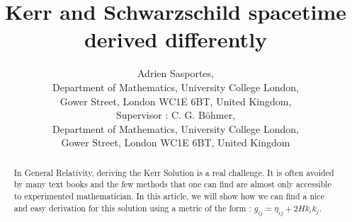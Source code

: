 \documentclass[a4paper,12pt]{article}
\title{Kerr and Schwarzschild spacetime derived differently}
\author{Adrien Sasportes,\\
Department of Mathematics, University College London, \\
Gower Street, London WC1E 6BT, United Kingdom,
\\ Supervisor : C. G. B\"ohmer,\\
Department of Mathematics, University College London, \\
Gower Street, London WC1E 6BT, United Kingdom
}
\theoremstyle{definition}
\begin{document}
\pagestyle{headings}
\begin{titlepage}
\clearpage\maketitle
\begin{abstract}
	In General Relativity, deriving the Kerr Solution is a real challenge.
	It is often avoided by many text books and the few methods that one can find are almost only accessible to experimented mathematician.
	In this article, we will show how we can find a nice and easy derivation for this solution using a metric of the form : $g_{ij}=\eta_{ij}+2Hk_ik_j$.
\end{abstract}
\thispagestyle{empty}
\pagebreak
\clearpage\mbox{}\thispagestyle{empty}\clearpage
\clearpage\tableofcontents
\thispagestyle{empty}
\pagebreak
\clearpage\mbox{}\thispagestyle{empty}\clearpage
{}

\end{titlepage}
\newtheorem{definition}{Definition}

\end{document}

